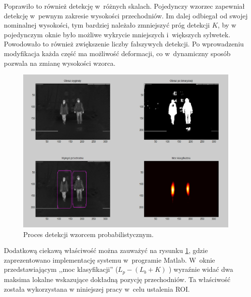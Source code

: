 Poprawiło to również detekcję w~różnych skalach. 
Pojedynczy wzorzec zapewniał detekcję w~pewnym zakresie wysokości przechodniów. 
Im dalej odbiegał od swojej nominalnej wysokości, tym bardziej należało zmniejszyć próg detekcji $K$, by w pojedynczym oknie było możliwe wykrycie mniejszych i~większych sylwetek. %
Powodowało to również zwiększenie liczby fałszywych detekcji. 
Po wprowadzeniu modyfikacja każda część ma możliwość deformacji, co w~dynamiczny sposób pozwala na zmianę wysokości wzorca.

\begin{figure}
\centering
\includegraphics[width=0.8\linewidth]{images/sim_window.png}
\caption[Proces detekcji wzorcem probabilistycznym.]{Proces detekcji wzorcem probabilistycznym. \cite{kankaing}}
\label{fig:sim_window}
\end{figure}

Dodatkową ciekawą właściwość można zauważyć na rysunku \ref{fig:sim_window}, gdzie zaprezentowano implementację systemu w~programie Matlab. 
W~oknie przedstawiającym ,,moc klasyfikacji'' ($L_p - (L_b + K)$ ) wyraźnie widać dwa maksima lokalne wskazujące dokładną pozycję przechodniów. 
Ta właściwość została wykorzystana w niniejszej pracy w~celu ustalenia ROI.



